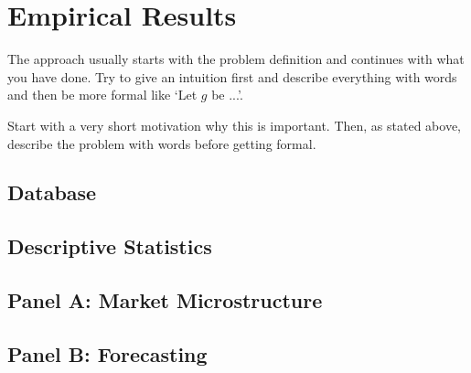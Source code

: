 \chapter{Empirical Results}\label{chap:mainresults}
The approach usually starts with the problem definition and continues with what you have done. Try to give an intuition first and describe everything with words and then be more formal like `Let $g$ be ...'.

Start with a very short motivation why this is important. Then, as stated above, describe the problem with words before getting formal.
\section{Database}







\section{Descriptive Statistics}

\section{Panel A: Market Microstructure}

\section{Panel B: Forecasting}